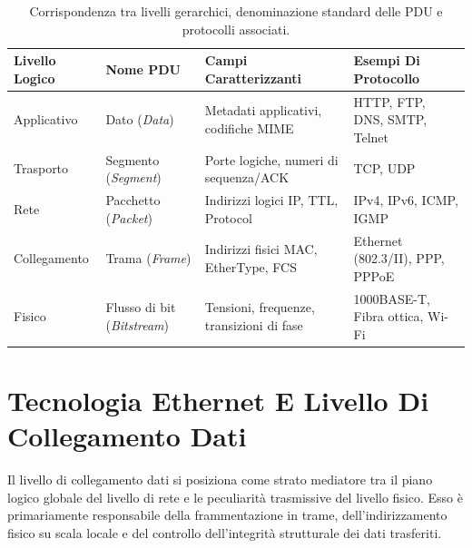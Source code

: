 \documentclass[11pt, a4paper]{article}
\begin{document}
\begin{table}[H]
    \centering
    \small %
    \renewcommand{\arraystretch}{1.25} %
    \caption{Corrispondenza tra livelli gerarchici, denominazione standard delle PDU e protocolli associati.}
    \label{tab:pdu_layers}

    \begin{tabularx}{\linewidth}{l l >{\hsize=0.9\hsize\raggedright\arraybackslash}X >{\hsize=1.1\hsize\raggedright\arraybackslash}X}
        \toprule
        \textbf{Livello Logico} &
        \textbf{Nome PDU} &
        \textbf{Campi Caratterizzanti} &
        \textbf{Esempi Di Protocollo} \\
        \midrule

        Applicativo &
        Dato (\emph{Data}) &
        Metadati applicativi, codifiche MIME &
        HTTP, FTP, DNS, SMTP, Telnet \\

        Trasporto &
        Segmento (\emph{Segment}) &
        Porte logiche, numeri di sequenza/ACK &
        TCP, UDP \\

        Rete &
        Pacchetto (\emph{Packet}) &
        Indirizzi logici IP, TTL, Protocol &
        IPv4, IPv6, ICMP, IGMP \\

        Collegamento &
        Trama (\emph{Frame}) &
        Indirizzi fisici MAC, EtherType, FCS &
        Ethernet (802.3/II), PPP, PPPoE \\

        Fisico &
        Flusso di bit (\emph{Bitstream}) &
        Tensioni, frequenze, transizioni di fase &
        1000BASE-T, Fibra ottica, Wi-Fi \\

        \bottomrule
    \end{tabularx}
\end{table}


\newpage

\section{Tecnologia Ethernet E Livello Di Collegamento Dati}

Il livello di collegamento dati si posiziona come strato mediatore tra il piano logico globale del livello di rete e le peculiarità trasmissive del livello fisico. Esso è primariamente responsabile della frammentazione in trame, dell'indirizzamento fisico su scala locale e del controllo dell'integrità strutturale dei dati trasferiti.
\end{document}
